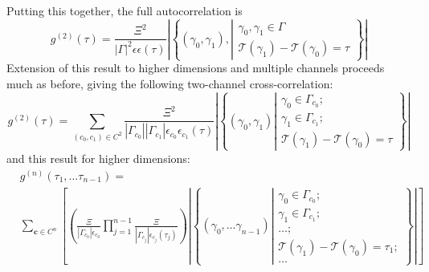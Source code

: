 \documentclass{article}
\newcommand{\braces}[1]{\ensuremath{\left\lbrace #1 \right\rbrace}}
\newcommand{\gn}[1]{\ensuremath{g^{(#1)}}}
\renewcommand{\vec}{\mathbf}
\newcommand{\abs}[1]{\ensuremath{\left|#1\right|}}
\newcommand{\Time}{\ensuremath{\mathcal{T}}}
\newcommand{\photon}{\ensuremath{\gamma}}
\newcommand{\photons}{\ensuremath{\Gamma}}
\newcommand{\integrationtime}{\ensuremath{\Xi}}
\newcommand{\resolution}{\ensuremath{\epsilon}}
\begin{document}
Putting this together, the full autocorrelation is
\begin{equation}
\gn{2}(\tau) = \frac{\integrationtime^{2}}{\abs{\photons}^{2}\resolution\resolution(\tau)}
                \abs{\braces{(\photon_{0}, \photon_{1}),
                              \left|\begin{aligned}
                              \photon_{0},\photon_{1}\in\photons \\
                              \Time(\photon_{1})-\Time(\photon_{0})=\tau
                              \end{aligned}\right.}}
\end{equation}
Extension of this result to higher dimensions and multiple channels proceeds much as before, giving the following two-channel cross-correlation:
\begin{equation}
\gn{2}(\tau) = \sum\limits_{(c_{0},c_{1})\in C^{2}}
                    {
                    \frac{\integrationtime^{2}}
                         {\abs{\photons_{c_{0}}}\abs{\photons_{c_{1}}}
                                \resolution_{c_{0}}\resolution_{c_{1}}(\tau)}
                    \abs{\braces{(\photon_{0},\photon_{1})
                          \left|\begin{aligned}
                          \photon_{0}\in\photons_{c_{0}};\\
                          \photon_{1}\in\photons_{c_{1}};\\
                          \Time(\photon_{1})-\Time(\photon_{0})=\tau
                          \end{aligned}\right.}}
                    }
\end{equation}
and this result for higher dimensions:
\begin{equation}
\label{eq:gn_set}
\begin{split}
&\gn{n}(\tau_{1},\ldots\tau_{n-1})= \\
& \sum\limits_{\vec{c}\in C^{n}}
                    {
                    \left[
                    \left(
                    \frac{\integrationtime}{\abs{\photons_{c_{0}}}\resolution_{c_{0}}}
                    \prod_{j=1}^{n-1}{\frac{\integrationtime}
                                           {\abs{\photons_{c_{j}}}\resolution_{c_{j}}(\tau_{j})}}
                    \right)
                    \abs{\braces{(\photon_{0},\ldots\photon_{n-1})
                          \left|\begin{aligned}
                          \photon_{0}\in\photons_{c_{0}};\\
                          \photon_{1}\in\photons_{c_{1}};\\
                          \ldots;\\
                          \Time(\photon_{1})-\Time(\photon_{0})=\tau_{1};\\
                          \ldots
                          \end{aligned}\right.}}
                    \right]
                    }
\end{split}
\end{equation}
\end{document}
